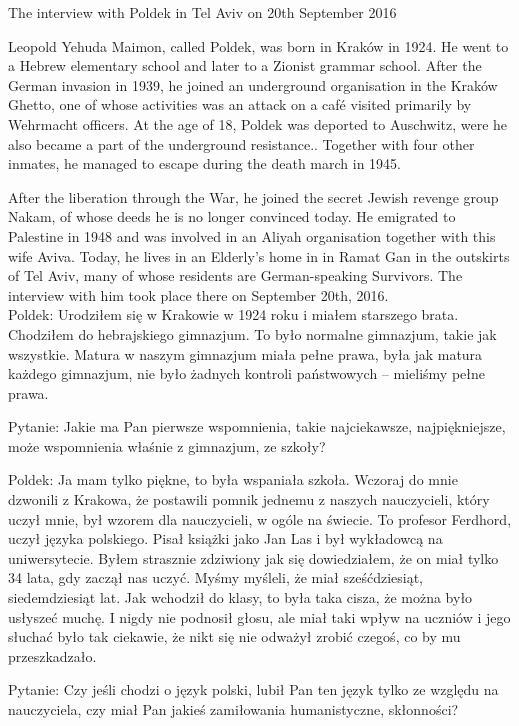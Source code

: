 The interview with Poldek in Tel Aviv on 20th September 2016 

Leopold Yehuda Maimon, called Poldek, was born in Kraków in 1924. He went to a Hebrew elementary school and later to a Zionist grammar school. After the German invasion in 1939, he joined an underground organisation in the Kraków Ghetto, one of whose activities was an attack on a café visited primarily by Wehrmacht officers. At the age of 18, Poldek was deported to Auschwitz, were he also became a part of the underground resistance.. Together with four other inmates, he managed to escape during the death march in 1945. 

After the liberation through the War, he joined the secret Jewish revenge group Nakam, of whose deeds he is no longer convinced today. He emigrated to Palestine in 1948 and was involved in an Aliyah organisation together with this wife Aviva. Today, he lives in an Elderly’s home in in Ramat Gan in the outskirts of Tel Aviv, many of whose residents are German-speaking Survivors. The interview with him took place there on September 20th, 2016. \\

Poldek: Urodziłem się w Krakowie w 1924 roku i miałem starszego brata. Chodziłem do hebrajskiego gimnazjum. To było normalne gimnazjum, takie jak wszystkie. Matura w naszym gimnazjum miała pełne prawa, była jak matura każdego gimnazjum, nie było żadnych kontroli państwowych – mieliśmy pełne prawa.  

Pytanie: Jakie ma Pan pierwsze wspomnienia, takie najciekawsze, najpiękniejsze, może wspomnienia właśnie z gimnazjum, ze szkoły?  

Poldek: Ja mam tylko piękne, to była wspaniała szkoła. Wczoraj do mnie dzwonili z Krakowa, że postawili pomnik jednemu z naszych nauczycieli, który uczył mnie, był wzorem dla nauczycieli, w ogóle na świecie. To profesor Ferdhord, uczył języka polskiego. Pisał książki jako Jan Las i był wykładowcą na uniwersytecie. Byłem strasznie zdziwiony jak się dowiedziałem, że on miał tylko 34 lata, gdy zaczął nas uczyć. Myśmy myśleli, że miał sześćdziesiąt, siedemdziesiąt lat. Jak wchodził do klasy, to była taka cisza, że można było usłyszeć muchę. I nigdy nie podnosił głosu, ale miał taki wpływ na uczniów i jego słuchać było tak ciekawie, że nikt się nie odważył zrobić czegoś, co by mu przeszkadzało.  

Pytanie: Czy jeśli chodzi o język polski, lubił Pan ten język tylko ze względu na nauczyciela, czy miał Pan jakieś zamiłowania humanistyczne, skłonności?  

